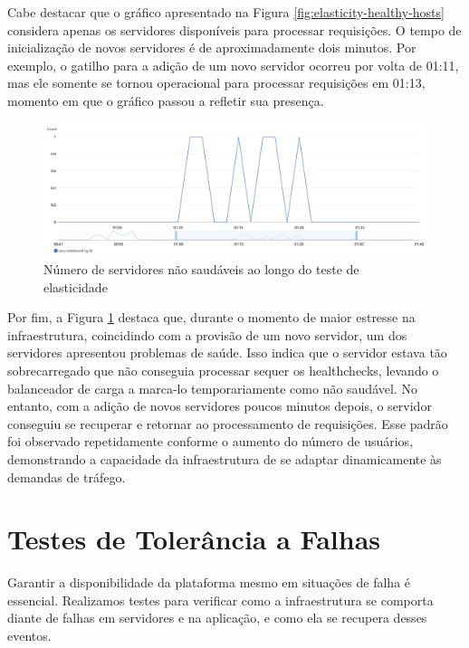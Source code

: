 Cabe destacar que o gráfico apresentado na Figura \ref{fig:elasticity-healthy-hosts} considera apenas os servidores disponíveis para processar requisições. O tempo de inicialização de novos servidores é de aproximadamente dois minutos. Por exemplo, o gatilho para a adição de um novo servidor ocorreu por volta de 01:11, mas ele somente se tornou operacional para processar requisições em 01:13, momento em que o gráfico passou a refletir sua presença.

\begin{figure}[H]
    \centering
    \includegraphics[width=1\textwidth]{assets/elasticity-test/unhealthy-hosts.png}
    \caption{Número de servidores não saudáveis ao longo do teste de elasticidade}
    \label{fig:elasticity-unhealthy-hosts}
\end{figure}

Por fim, a Figura \ref{fig:elasticity-unhealthy-hosts} destaca que, durante o momento de maior estresse na infraestrutura, coincidindo com a provisão de um novo servidor, um dos servidores apresentou problemas de saúde. Isso indica que o servidor estava tão sobrecarregado que não conseguia processar sequer os healthchecks, levando o balanceador de carga a marca-lo temporariamente como não saudável. No entanto, com a adição de novos servidores poucos minutos depois, o servidor conseguiu se recuperar e retornar ao processamento de requisições. Esse padrão foi observado repetidamente conforme o aumento do número de usuários, demonstrando a capacidade da infraestrutura de se adaptar dinamicamente às demandas de tráfego.


\section{Testes de Tolerância a Falhas}

Garantir a disponibilidade da plataforma mesmo em situações de falha é essencial. Realizamos testes para verificar como a infraestrutura se comporta diante de falhas em servidores e na aplicação, e como ela se recupera desses eventos.

